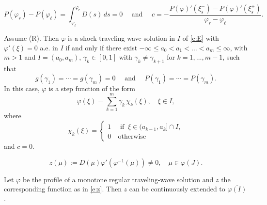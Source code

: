 \documentclass[10pt,a4paper]{amsart}
\renewcommand{\phi}{\varphi}
\begin{document}
\begin{equation}\label{e:hypo}
P(\phi_r)-P(\phi_{\ell})=\int_{\phi_\ell}^{\phi_r}D(s)\,d s=0
\quad \mbox{ and } \quad
c=-\frac{\displaystyle P(\varphi)'(\xi_s^-)-P(\phi)'(\xi_s^+)}{\phi_r-\phi_\ell}.
\end{equation}

\begin{proposition}\label{p:tratti}  Assume {\rm (R)}. Then $\phi $ is a shock traveling-wave solution in $I$ of \eqref{e:E} with $\phi'(\xi) = 0$ a.e.\! in $I$ if and only if there exist $-\infty\le a_0<a_1<\ldots<a_m\le \infty$, with $m>1$ and $I=(a_0, a_m)$, $\gamma_k\in [0,1]$ with $\gamma_k\ne \gamma_{k+1}$ for $k=1,\ldots,m-1$, such that 
\begin{equation}\label{e:ggPP}
g(\gamma_1)=\cdots =g(\gamma_m)=0
\quad \mbox{ and } \quad 
P(\gamma_1)=\cdots=P(\gamma_m).
\end{equation}
In this case, $\phi$ is a step function of the form
\begin{equation}\label{e:step}
\phi(\xi)
= \sum_{k=1}^{m} \gamma_k \, \chi_{k}(\xi), \quad  \xi\in I, 
\end{equation}
where \begin{equation*} \chi_k(\xi)=\begin{cases} 1 \ &\mbox{ if } \ \xi \in (a_{k-1},a_k]\cap I,
\\ 
0 \ &\mbox{otherwise}
\end{cases}
\end{equation*}
and  $c=0$.
\end{proposition}

\begin{equation}\label{e:z}
z(\mu):=D(\mu)\phi'\left(\phi^{-1}(\mu)\right) \neq 0, \quad \mu \in \varphi(J).
\end{equation}

 \begin{lemma}\label{l:extended} Let $\phi$ be the profile of a monotone regular traveling-wave solution and  $z$ the corresponding function as in  \eqref{e:z}. Then $z$ can be continuously extended to $\overline{\phi(I)}$. 
 \end{lemma}
\end{document}
